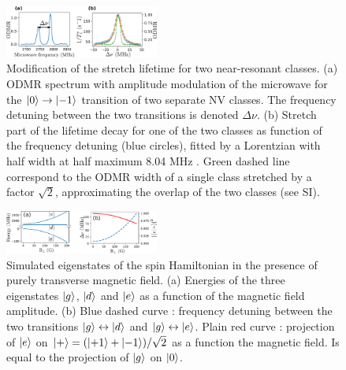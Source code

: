 \documentclass[preprintnumbers,amsmath,amssymb,superscriptaddress,twocolumn,showpacs]{revtex4-1}
\begin{document}
\begin{figure}
\includegraphics[width=0.45\textwidth]{Figures/fig largeur fluct}
\caption{Modification of the stretch lifetime for two near-resonant classes. (a) ODMR spectrum with amplitude modulation of the microwave for the $\ket{0} \to \ket{-1}$ transition of two separate NV classes. The frequency detuning between the two transitions is denoted $\Delta \nu$. (b) Stretch part of the lifetime decay for one of the two classes as function of the frequency detuning (blue circles), fitted by a Lorentzian with half width at half maximum 8.04 MHz . Green dashed line correspond to the ODMR width of a single class stretched by a factor $\sqrt 2$, approximating the overlap of the two classes (see SI).}
\label{largeur_fluct}
\end{figure}

\begin{figure}
\includegraphics[width=0.45\textwidth]{Figures/fig transverse field simu}
\caption{Simulated eigenstates of the spin Hamiltonian in the presence of purely transverse magnetic field. (a) Energies of the three eigenstates $\ket{g}$, $\ket{d}$ and $\ket{e}$ as a function of the magnetic field amplitude. (b) Blue dashed curve : frequency detuning between the two transitions $\ket{g} \leftrightarrow \ket{d}$ and $\ket{g} \leftrightarrow \ket{e}$. Plain red curve : projection of $\ket{e}$ on $\ket{+}=(\ket{+1}+\ket{-1})/\sqrt{2}$ as a function the magnetic field. Is equal to the projection of $\ket{g}$ on $\ket{0}$.}
\label{calculs_B_transverse}
\end{figure}
\end{document}
